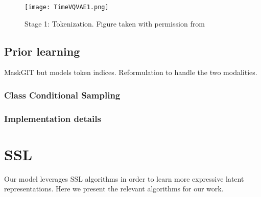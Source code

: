 \documentclass[../../thesis.tex]{subfiles}
\begin{document}
\begin{figure}[h]
    \texttt{[image: TimeVQVAE1.png]}
    \centering 
    \label{fig:TimeVQVAE1}
    \caption{Stage 1: Tokenization. Figure taken with permission from \cite{TimeVQVAE}}
\end{figure}



\subsection{Prior learning}
MaskGIT but models token indices. Reformulation to handle the two modalities.

\subsubsection{Class Conditional Sampling}

\subsubsection{Implementation details}




\section{SSL}

Our model leverages SSL algorithms in order to learn more expressive latent representations. Here we present the relevant algorithms for our work. 


\end{document}
